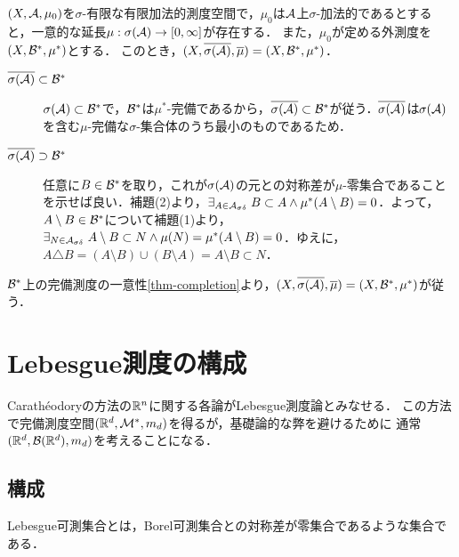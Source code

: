 \documentclass[uplatex, dvipdfmx]{jsreport}
\begin{document}
\begin{theorem}[完備化]\label{thm-complesion-and-extension}
    $(X,\mathcal{A},\mu_0)$を$\sigma$-有限な有限加法的測度空間で，$\mu_0$は$\mathcal{A}$上$\sigma$-加法的であるとすると，一意的な延長$\mu:\sigma(\mathcal{A})\to[0,\infty]$が存在する．
    また，$\mu_0$が定める外測度を$(X,\mathcal{B}^*,\mu^*)$とする．
    このとき，$(X,\overline{\sigma(\mathcal{A})},\overline{\mu})=(X,\mathcal{B}^*,\mu^*)$．
\end{theorem}
\begin{Proof}\mbox{}
    \begin{description}
        \item[$\overline{\sigma(\mathcal{A})}\subset\mathcal{B}^*$] $\sigma(\mathcal{A})\subset\mathcal{B}^*$で，$\mathcal{B}^*$は$\mu^*$-完備であるから，$\overline{\sigma(\mathcal{A})}\subset\mathcal{B}^*$が従う．$\overline{\sigma(\mathcal{A})}$は$\sigma(\mathcal{A})$を含む$\mu$-完備な$\sigma$-集合体のうち最小のものであるため．
        \item[$\overline{\sigma(\mathcal{A})}\supset\mathcal{B}^*$] 任意に$B\in\mathcal{B}^*$を取り，これが$\sigma(\mathcal{A})$の元との対称差が$\mu$-零集合であることを示せば良い．補題(2)より，$\exists_{A\in\mathcal{A}_{\sigma\delta}}\;B\subset A\land \mu^*(A\setminus B)=0$．よって，$A\setminus B\in\mathcal{B}^*$について補題(1)より，$\exists_{N\in\mathcal{A}_{\sigma\delta}}\;A\setminus B\subset N\land \mu(N)=\mu^*(A\setminus B)=0$．ゆえに，$A\triangle B=(A\setminus B)\cup(B\setminus A)=A\setminus B\subset N$．
    \end{description}
    $\mathcal{B}^*$上の完備測度の一意性\ref{thm-completion}より，$(X,\overline{\sigma(\mathcal{A})},\overline{\mu})=(X,\mathcal{B}^*,\mu^*)$が従う．
\end{Proof}


\section{Lebesgue測度の構成}

\begin{tcolorbox}[colframe=ForestGreen, colback=ForestGreen!10!white,breakable,colbacktitle=ForestGreen!40!white,coltitle=black,fonttitle=\bfseries\sffamily,
title=]
    Carathéodoryの方法の$\mathbb{R}^n$に関する各論がLebesgue測度論とみなせる．
    この方法で完備測度空間$(\mathbb{R}^d,\mathcal{M}^*,m_d)$を得るが，基礎論的な弊を避けるために
    通常$(\mathbb{R}^d,\mathcal{B}(\mathbb{R}^d),m_d)$を考えることになる．
\end{tcolorbox}

\subsection{構成}

\begin{tcolorbox}[colframe=ForestGreen, colback=ForestGreen!10!white,breakable,colbacktitle=ForestGreen!40!white,coltitle=black,fonttitle=\bfseries\sffamily,
title=]
    Lebesgue可測集合とは，Borel可測集合との対称差が零集合であるような集合である．
\end{tcolorbox}
\end{document}
